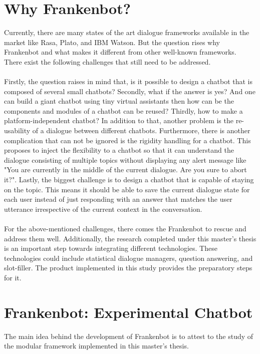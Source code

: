 \section{Why Frankenbot?}
Currently, there are many states of the art dialogue frameworks available in the market like Rasa, Plato, and IBM Watson. But the question rises why Frankenbot and what makes it different from other well-known frameworks. There exist the following challenges that still need to be addressed.
\\~\\
Firstly, the question raises in mind that, is it possible to design a chatbot that is composed of several small chatbots? Secondly, what if the answer is yes? And one can build a giant chatbot using tiny virtual assistants then how can be the components and modules of a chatbot can be reused? Thirdly, how to make a platform-independent chatbot? In addition to that, another problem is the re-usability of a dialogue between different chatbots. Furthermore, there is another complication that can not be ignored is the rigidity handling for a chatbot. This proposes to inject the flexibility to a chatbot so that it can understand the dialogue consisting of multiple topics without displaying any alert message like "You are currently in the middle of the current dialogue. Are you sure to abort it?". Lastly, the biggest challenge is to design a chatbot that is capable of staying on the topic. This means it should be able to save the current dialogue state for each user instead of just responding with an answer that matches the user utterance irrespective of the current context in the conversation. 
\\~\\
For the above-mentioned challenges, there comes the Frankenbot to rescue and address them well. Additionally, the research completed under this master's thesis is an important step towards integrating different technologies. These technologies could include statistical dialogue managers, question answering, and slot-filler. The product implemented in this study provides the preparatory steps for it.

\section{Frankenbot: Experimental Chatbot}
The main idea behind the development of Frankenbot is to attest to the study of the modular framework implemented in this master's thesis. 
